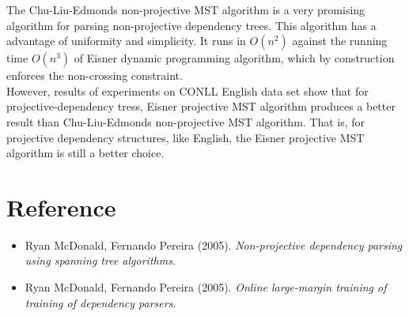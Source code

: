 \documentclass[12pt]{article}
\begin{document}
The Chu-Liu-Edmonds non-projective MST algorithm is a very promising algorithm for parsing non-projective dependency trees. This algorithm has a advantage of uniformity and simplicity. It runs in $O(n^2)$ against the running time $O(n^3)$ of Eisner dynamic programming algorithm, which by construction enforces the non-crossing constraint. \\

However, results of experiments on CONLL English data set show that for projective-dependency tress, Eisner projective MST algorithm produces a better result than Chu-Liu-Edmonds non-projective MST algorithm. That is, for projective dependency structures, like English, the Eisner projective MST algorithm is still a better choice.

\section{Reference}

\begin{itemize}
\item Ryan McDonald, Fernando Pereira (2005). \emph {Non-projective dependency parsing using spanning tree algorithms}.
\item Ryan McDonald, Fernando Pereira (2005). \emph {Online large-margin training of training of dependency parsers}.
\end{itemize}
\end{document}
